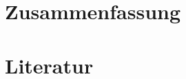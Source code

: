 \documentclass[12pt,a4paper]{scrartcl}
\begin{document}
\section{Zusammenfassung}

\section{Literatur}

\printbibliography
\end{document}
